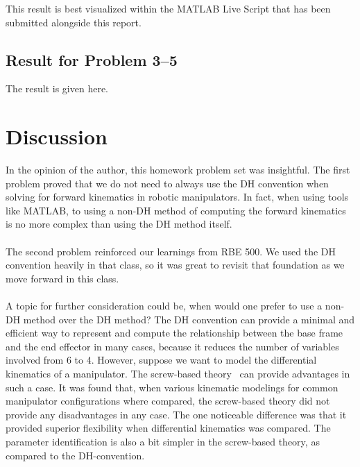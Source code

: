 \documentclass[conference]{IEEEtran}
\begin{document}
This result is best visualized within the MATLAB Live Script that has been submitted 
alongside this report.

\subsection{Result for Problem 3--5}

The result is given here.

\section{Discussion}
In the opinion of the author, this homework problem set was insightful. The
first problem proved that we do not need to always use the DH convention
when solving for forward kinematics in robotic manipulators. In fact, when
using tools like MATLAB, to using a non-DH method of
computing the forward kinematics is no more complex than using the DH method
itself.\\\\
The second problem reinforced our learnings from RBE 500. We used the DH
convention heavily in that class, so it was great to revisit that foundation
as we move forward in this class.\\\\
A topic for further consideration could be, when would one prefer to use
a non-DH method over the DH method? The DH convention can provide a minimal
and efficient way to represent and compute the relationship between the base
frame and the end effector in many cases, because it reduces the number of
variables involved from 6 to 4. However, suppose we want to model the
differential kinematics of a manipulator. The screw-based theory~\cite{Rocha2011}
can provide advantages in such a case. It was found that, when
various kinematic modelings for common manipulator configurations where
compared, the screw-based theory did not provide any disadvantages in any
case. The one noticeable difference was that it provided superior flexibility
when differential kinematics was compared.
The parameter identification is also a bit simpler in the screw-based theory, as
compared to the DH-convention.


\end{document}
